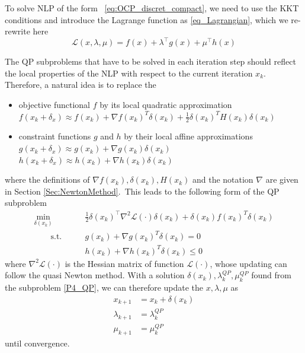 \documentclass  [
  paper    = a4,
  BCOR     = 10mm,
  twoside,
  fontsize = 12pt,
  fleqn,
  toc      = bibnumbered,
  toc      = listofnumbered,
  numbers  = noendperiod,
  headings = normal,
  listof   = leveldown,
  version  = 3.03
]                                       {scrreprt}
\newcommand{\<}{\langle}
\renewcommand{\>}{\rangle}
\begin{document}
To solve NLP of the form  \ref{eq:OCP_discret_compact}, we need to use the KKT conditions and introduce the Lagrange function as \ref{eq_Lagrangian}, which we re-rewrite here 
\begin{equation}
	\mathcal{L}(x,\lambda, \mu) = f(x) + \lambda^\top g(x) +  \mu^\top h(x) 
\end{equation}

The QP subproblems that have to be solved in each iteration step should reflect the local properties of the NLP with respect to the current iteration $x_k$. Therefore, a natural idea is to replace the
\begin{itemize}
	\item objective functional $f$ by its local quadratic approximation\\
	$f(x_k + \delta_x) \approx f(x_k) + \nabla f(x_k)^T\delta(x_k) +\frac{1}{2}\delta(x_k) ^TH(x_k)\delta(x_k) $
	\item constraint functions $g$ and $h$ by their local affine approximations \\
	$g(x_k + \delta_x) \approx  g(x_k) + \nabla g(x_k)\delta(x_k) $ \\
	$h(x_k + \delta_x) \approx  h(x_k) + \nabla h(x_k)\delta(x_k)$
\end{itemize}

where the definitions of $\nabla f(x_k), \delta(x_k) , H(x_k)$ and the notation $\nabla$ are given in Section \ref{Sec:NewtonMethod}. This leads to the following form of the QP subproblem
\begin{subequations}
	\label{eq:ocp_QP}
	\begin{align}
		\underset{\delta(x_k) }{\text{min}} \qquad & \frac{1}{2} \delta(x_k)^\top \nabla^2 \mathcal{L}(\cdot)\delta(x_k) +\delta(x_k) f(x_k)^T \delta(x_k)	\\
		\qquad \text{s.t.}\qquad	& g(x_k) + \nabla g(x_k)^T\delta(x_k) = 0 \\
		& h(x_k) + \nabla h(x_k)^T\delta(x_k) \leq 0
	\end{align}
	\label{P4_QP}
\end{subequations}
where $\nabla^2 \mathcal{L}(\cdot)$ is the Hessian matrix of function $\mathcal{L}(\cdot)$, whose updating can follow the quasi Newton method. With a solution $\delta(x_k), \lambda_k^{QP}, \mu_k^{QP}$ found from the subproblem \ref{P4_QP}, we can therefore update the $x, \lambda, \mu$ as 
\begin{subequations}
	\begin{align}
		x_{k+1} &= x_k + \delta(x_k) \\
		\lambda_{k+1} &= \lambda_k^{QP} \\ 
		\mu_{k+1}&= \mu_k^{QP} 
	\end{align}
\end{subequations}
until convergence. 
\end{document}
